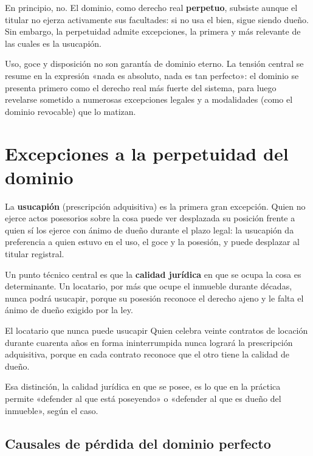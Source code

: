 \documentclass[12pt,oneside]{book}
\begin{document}
En principio, no. El dominio, como derecho real \textbf{perpetuo}, subsiste aunque el titular no ejerza activamente sus facultades: si no usa el bien, sigue siendo dueño. Sin embargo, la perpetuidad admite excepciones, la primera y más relevante de las cuales es la usucapión.

\begin{note}
Uso, goce y disposición no son garantía de dominio eterno. La tensión central se resume en la expresión «nada es absoluto, nada es tan perfecto»: el dominio se presenta primero como el derecho real más fuerte del sistema, para luego revelarse sometido a numerosas excepciones legales y a modalidades (como el dominio revocable) que lo matizan.
\end{note}

\section{Excepciones a la perpetuidad del dominio}
\label{sec:excepciones}

La \textbf{usucapión} (prescripción adquisitiva) es la primera gran excepción. Quien no ejerce actos posesorios sobre la cosa puede ver desplazada su posición frente a quien sí los ejerce con ánimo de dueño durante el plazo legal: la usucapión da preferencia a quien estuvo en el uso, el goce y la posesión, y puede desplazar al titular registral.

Un punto técnico central es que la \textbf{calidad jurídica} en que se ocupa la cosa es determinante. Un locatario, por más que ocupe el inmueble durante décadas, nunca podrá usucapir, porque su posesión reconoce el derecho ajeno y le falta el ánimo de dueño exigido por la ley.

\begin{example}{El locatario que nunca puede usucapir}
Quien celebra veinte contratos de locación durante cuarenta años en forma ininterrumpida nunca logrará la prescripción adquisitiva, porque en cada contrato reconoce que el otro tiene la calidad de dueño.
\end{example}

Esa distinción, la calidad jurídica en que se posee, es lo que en la práctica permite «defender al que está poseyendo» o «defender al que es dueño del inmueble», según el caso.

\subsection{Causales de pérdida del dominio perfecto}
\end{document}
